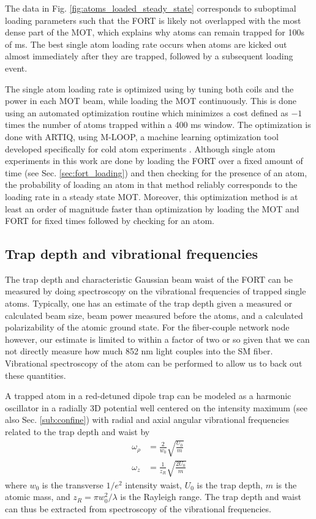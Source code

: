The data in Fig. \ref{fig:atoms_loaded_steady_state} corresponds to suboptimal loading parameters such that the FORT is likely not overlapped with the most dense part of the MOT, which explains why atoms can remain trapped for 100s of ms. The best single atom loading rate occurs when atoms are kicked out almost immediately after they are trapped, followed by a subsequent loading event.

The single atom loading rate is optimized using by tuning both coils and the power in each MOT beam, while loading the MOT continuously. This is done using an automated optimization routine which minimizes a cost defined as $-1$ times the number of atoms trapped within a 400 ms window. The optimization is done with ARTIQ, using M-LOOP, a machine learning optimization tool developed specifically for cold atom experiments \cite{Wigley2016}. Although single atom experiments in this work are done by loading the FORT over a fixed amount of time (see Sec. \ref{sec:fort_loading}) and then checking for the presence of an atom, the probability of loading an atom in that method reliably corresponds to the loading rate in a steady state MOT. Moreover, this optimization method is at least an order of magnitude faster than optimization by loading the MOT and FORT for fixed times followed by checking for an atom. 

\subsection{Trap depth and vibrational frequencies}

The trap depth and characteristic Gaussian beam waist of the FORT can be measured by doing spectroscopy on the vibrational frequencies of trapped single atoms. Typically, one has an estimate of the trap depth given a measured or calculated beam size, beam power measured before the atoms, and a calculated polarizability of the atomic ground state. For the fiber-couple network node however, our estimate is limited to within a factor of two or so given that we can not directly measure how much 852 nm light couples into the SM fiber. Vibrational spectroscopy of the atom can be performed to allow us to back out these quantities.

A trapped atom in a red-detuned dipole trap can be modeled as a harmonic oscillator in a radially 3D potential well centered on the intensity maximum (see also Sec. \ref{sub:confine}) with radial and axial angular vibrational frequencies related to the trap depth and waist by
\begin{align}\label{eq:trapfreqs}
    \omega_{\rho} &= \frac{2}{w_0}\sqrt{\frac{U_0}{m}} \\
    \omega_z &= \frac{1}{z_R}\sqrt{\frac{2U_0}{m}}
\end{align}
where $w_0$ is the transverse $1/e^2$ intensity waist, $U_0$ is the trap depth, $m$ is the atomic mass, and $z_R=\pi w_0^2/\lambda$ is the Rayleigh range. The trap depth and waist can thus be extracted from spectroscopy of the vibrational frequencies. 


